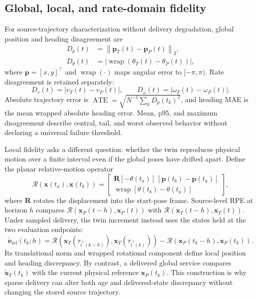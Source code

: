 \documentclass[journal,onecolumn]{IEEEtran}
\begin{document}
\subsection{Global, local, and rate-domain fidelity}
For source-trajectory characterization without delivery degradation, global position and heading disagreement are
\begin{align}
D_p(t)&=\left\|\mathbf{p}_T(t)-\mathbf{p}_P(t)\right\|_2,\\
D_\theta(t)&=\left|\operatorname{wrap}\!\left(\theta_T(t)-\theta_P(t)\right)\right|,
\end{align}
where $\mathbf{p}=[x,y]^\top$ and $\operatorname{wrap}(\cdot)$ maps angular error to $[-\pi,\pi)$. Rate disagreement is retained separately:
\begin{equation}
D_v(t)=|v_T(t)-v_P(t)|,
\qquad
D_\omega(t)=|\omega_T(t)-\omega_P(t)|.
\end{equation}
Absolute trajectory error is $\operatorname{ATE}=\sqrt{N^{-1}\sum_k D_p(t_k)^2}$, and heading MAE is the mean wrapped absolute heading error. Mean, p95, and maximum disagreement describe central, tail, and worst observed behavior without declaring a universal failure threshold.

Local fidelity asks a different question: whether the twin reproduces physical motion over a finite interval even if the global poses have drifted apart. Define the planar relative-motion operator
\begin{equation}
\mathcal{R}\!\left(\mathbf{x}(t_a),\mathbf{x}(t_b)\right)=
\begin{bmatrix}
\mathbf{R}[-\theta(t_a)]\,[\mathbf{p}(t_b)-\mathbf{p}(t_a)]\\
\operatorname{wrap}[\theta(t_b)-\theta(t_a)]
\end{bmatrix},
\end{equation}
where $\mathbf{R}$ rotates the displacement into the start-pose frame. Source-level RPE at horizon $h$ compares $\mathcal{R}(\mathbf{x}_P(t-h),\mathbf{x}_P(t))$ with $\mathcal{R}(\mathbf{x}_T(t-h),\mathbf{x}_T(t))$. Under sampled delivery, the twin increment instead uses the states held at the two evaluation endpoints:
\begin{equation}
\widetilde{\mathbf{e}}_{\mathrm{rel}}(t_k;h)=
\mathcal{R}\!\left(
\mathbf{x}_T(\tau_{i^*(k-h)}),
\mathbf{x}_T(\tau_{i^*(k)})
\right)
-
\mathcal{R}\!\left(
\mathbf{x}_P(t_k-h),\mathbf{x}_P(t_k)
\right).
\end{equation}
Its translational norm and wrapped rotational component define local position and heading discrepancy. By contrast, a delivered global service compares $\widetilde{\mathbf{x}}_T(t_k)$ with the current physical reference $\mathbf{x}_P(t_k)$. This construction is why sparse delivery can alter both age and delivered-state discrepancy without changing the stored source trajectory.
\end{document}
